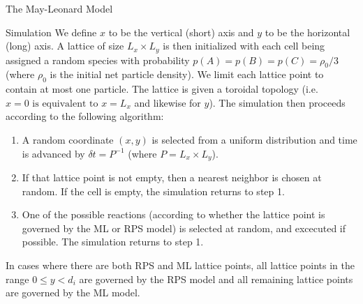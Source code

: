 \documentclass{beamer}
\begin{document}
\begin{frame}{}
\begin{textblock}{0.32}
\begin{block}{The May-Leonard Model}
    \end{block}
    \hfill
    \begin{block}{Simulation}
        We define $x$ to be the vertical (short) axis and $y$ to be the horizontal
        (long) axis. A lattice of size $L_x \times L_y$ is then initialized with each cell 
        being assigned a random species with probability $p (A) = p (B) = p (C) = {\rho_0}/{3}$ (where $\rho_0$ is the 
        initial net particle density). We limit each lattice point to contain at most
        one particle.
        The lattice is given a toroidal topology (i.e. $x=0 \text{ is equivalent 
        to } x = L_x$ and likewise for $y$). The simulation then proceeds according 
        to the following algorithm:

        \begin{enumerate}
            \item A random coordinate $(x, y)$ is selected from a uniform distribution
                and time is advanced by $\delta t = P^{-1}$ (where $P = L_x \times L_y$).
            \item If that lattice point is not empty, then a nearest neighbor is chosen
                at random. If the cell is empty, the simulation returns to step 1.
            \item One of the possible reactions (according to whether the lattice point
                is governed by the ML or RPS model) is selected at random, and excecuted
                if possible. The simulation returns to step 1.
        \end{enumerate}

        In cases where there are both RPS and ML lattice points, all lattice points
        in the range $0 \leq y < d_i$ are governed by the RPS model and all 
        remaining lattice points are governed by the ML model.
    \end{block}
\end{textblock}


\end{frame}
\end{document}
